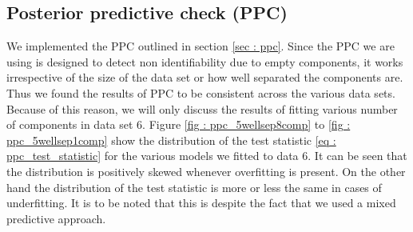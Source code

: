 \subsection{Posterior predictive check (PPC)}
\label{subsec : ppc_simulation}
We implemented the PPC outlined in section \ref{sec : ppc}. Since the PPC we are using is designed to detect non identifiability due to empty components, it works irrespective of the size of the data set or how well separated the components are. Thus we found the results of PPC to be consistent across the various data sets. Because of this reason, we will only discuss the results of fitting various number of components in data set 6. Figure \ref{fig : ppc_5wellsep8comp} to \ref{fig : ppc_5wellsep1comp} show the distribution of the test statistic \ref{eq : ppc_test_statistic} for the various models we fitted to data 6. It can be seen that the distribution is positively skewed whenever overfitting is present. On the other hand the distribution of the test statistic is more or less the same in cases of underfitting. It is to be noted that this is despite the fact that we used a mixed predictive approach.\\

